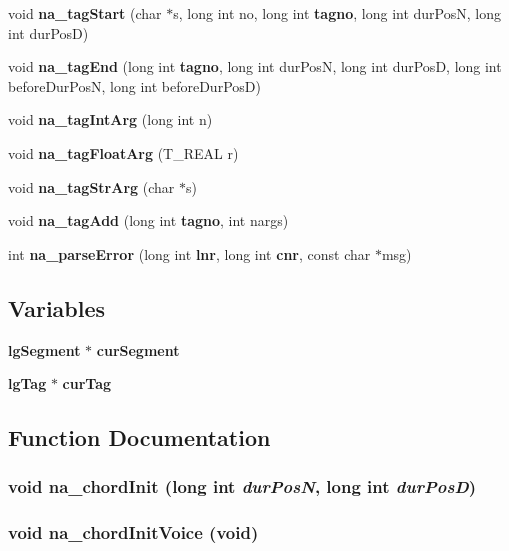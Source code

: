 \begin{CompactItemize}
void {\bf na\_\-tag\-Start} (char $\ast$s, long int no, long int {\bf tagno}, long int dur\-Pos\-N, long int dur\-Pos\-D)
\item 
void {\bf na\_\-tag\-End} (long int {\bf tagno}, long int dur\-Pos\-N, long int dur\-Pos\-D, long int before\-Dur\-Pos\-N, long int before\-Dur\-Pos\-D)
\item 
void {\bf na\_\-tag\-Int\-Arg} (long int n)
\item 
void {\bf na\_\-tag\-Float\-Arg} (T\_\-REAL r)
\item 
void {\bf na\_\-tag\-Str\-Arg} (char $\ast$s)
\item 
void {\bf na\_\-tag\-Add} (long int {\bf tagno}, int nargs)
\item 
int {\bf na\_\-parse\-Error} (long int {\bf lnr}, long int {\bf cnr}, const char $\ast$msg)
\end{CompactItemize}
\subsection*{Variables}
\begin{CompactItemize}
\item 
{\bf lg\-Segment} $\ast$ {\bf cur\-Segment}
\item 
{\bf lg\-Tag} $\ast$ {\bf cur\-Tag}
\end{CompactItemize}


\subsection{Function Documentation}
\subsubsection{\setlength{\rightskip}{0pt plus 5cm}void na\_\-chord\-Init (long int {\em dur\-Pos\-N}, long int {\em dur\-Pos\-D})}\label{lgguido_8cpp_a16}


\subsubsection{\setlength{\rightskip}{0pt plus 5cm}void na\_\-chord\-Init\-Voice (void)}\label{lgguido_8cpp_a15}


